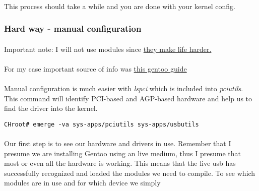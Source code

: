 \documentclass[10pt,a4paper]{article}
\begin{document}
                \paragraph{} This process should take a while and you are done with your kernel config.

            \newpage
            \subsubsection{Hard way - manual configuration}

                \paragraph{} Important note: I will not use modules since \href{https://wiki.gentoo.org/wiki/Kernel/Gentoo_Kernel_Configuration_Guide#Modules_do_not_get_loaded_automatically}{they make life harder.}

                \paragraph{} For my case important source of info was \href{https://wiki.gentoo.org/wiki/Lenovo_ThinkPad_T440s}{this gentoo guide}

                \paragraph{} Manual configuration is much easier with \textit{lspci} which is included into \textit{pciutils}. This command will identify PCI-based and AGP-based hardware and help us to find the driver into the kernel.

\begin{lstlisting}[style=BashInputCHRoot]
 CHroot# emerge -va sys-apps/pciutils sys-apps/usbutils
\end{lstlisting}

                \paragraph{} Our first step is to see our hardware and drivers in use. Remember that I presume we are installing Gentoo using an live medium, thus I presume that most or even all the hardware is working. This means that the live usb has successfully recognized and loaded the modules we need to compile. To see which modules are in use and for which device we simply
\end{document}
